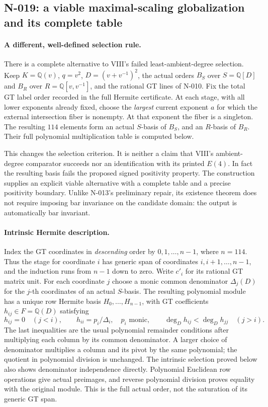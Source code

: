 \subsection{N-019: a viable maximal-scaling globalization and its complete table}
\label{sec:nonstandard-maximal-scaling}

\paragraph{A different, well-defined selection rule.}
There is a complete alternative to VIII's failed least-ambient-degree
selection.  Keep $K=\mathbb Q(v)$, $q=v^2$, $D=(v+v^{-1})^2$,
the actual orders $B_S$ over $S=\mathbb Q[D]$ and $B_R$ over
$R=\mathbb Q[v,v^{-1}]$, and the rational GT lines of N-010.
Fix the total GT label order recorded in the full Hermite certificate.
At each stage, with all lower exponents already fixed, choose the
\emph{largest} current exponent $a$ for which the external intersection
fiber is nonempty.  At that exponent the fiber is a singleton.
The resulting $114$ elements form an actual $S$-basis of $B_S$,
and an $R$-basis of $B_R$.  Their full polynomial multiplication
table is computed below.

This changes the selection criterion.  It is neither a claim that
VIII's ambient-degree comparator succeeds nor an identification with
its printed $E(4)$.  In fact the resulting basis fails the proposed
signed positivity property.  The construction supplies an explicit
viable alternative with a complete table and a precise positivity
boundary.  Unlike N-013's preliminary repair, its existence theorem
does not require imposing bar invariance on the candidate domain:
the output is automatically bar invariant.

\paragraph{Intrinsic Hermite description.}
Index the GT coordinates in \emph{descending} order by
$0,1,\ldots,n-1$, where $n=114$.  Thus the stage for coordinate $i$
has generic span of coordinates $i,i+1,\ldots,n-1$, and the induction
runs from $n-1$ down to zero.  Write $c'_i$ for its rational GT
matrix unit.  For each coordinate $j$ choose a monic common
denominator $\Delta_j(D)$ for the $j$-th coordinates of an actual
$S$-basis.  The resulting polynomial module has a unique row Hermite
basis $H_0,\ldots,H_{n-1}$, with GT coefficients
$h_{ij}\in F=\mathbb Q(D)$ satisfying
\[
 h_{ij}=0\quad(j<i),\qquad
 h_{ii}=p_i/\Delta_i,\quad p_i\text{ monic},\qquad
 \deg_D h_{ij}<\deg_D h_{jj}\quad(j>i).
 \tag{N-97}
\]
The last inequalities are the usual polynomial remainder conditions
after multiplying each column by its common denominator.  A larger
choice of denominator multiplies a column and its pivot by the same
polynomial; the quotient in polynomial division is unchanged.
The intrinsic selection proved below also shows denominator
independence directly.  Polynomial Euclidean row operations give
actual preimages, and reverse polynomial division proves equality
with the original module.  This is the full actual order, not the
saturation of its generic GT span.


